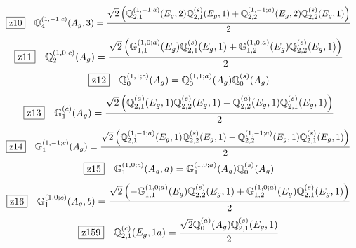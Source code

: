 \documentclass[fleqn,10pt,landscape]{jsarticle}
\begin{document}
\begin{dmath*}
\hspace*{3mm}\fbox{z10}\quad \mathbb{Q}_{4}^{(1,-1;c)}(A_{g},3)=\frac{\sqrt{2} \left(\mathbb{Q}_{2,1}^{(1,-1;a)}(E_{g},2) \mathbb{Q}_{2,1}^{(s)}(E_{g},1) + \mathbb{Q}_{2,2}^{(1,-1;a)}(E_{g},2) \mathbb{Q}_{2,2}^{(s)}(E_{g},1)\right)}{2}
\end{dmath*}
\begin{dmath*}
\hspace*{3mm}\fbox{z11}\quad \mathbb{Q}_{2}^{(1,0;c)}(A_{g})=\frac{\sqrt{2} \left(\mathbb{G}_{1,1}^{(1,0;a)}(E_{g}) \mathbb{Q}_{2,1}^{(s)}(E_{g},1) + \mathbb{G}_{1,2}^{(1,0;a)}(E_{g}) \mathbb{Q}_{2,2}^{(s)}(E_{g},1)\right)}{2}
\end{dmath*}
\begin{dmath*}
\hspace*{3mm}\fbox{z12}\quad \mathbb{Q}_{0}^{(1,1;c)}(A_{g})=\mathbb{Q}_{0}^{(1,1;a)}(A_{g}) \mathbb{Q}_{0}^{(s)}(A_{g})
\end{dmath*}
\begin{dmath*}
\hspace*{3mm}\fbox{z13}\quad \mathbb{G}_{1}^{(c)}(A_{g})=\frac{\sqrt{2} \left(\mathbb{Q}_{2,1}^{(a)}(E_{g},1) \mathbb{Q}_{2,2}^{(s)}(E_{g},1) - \mathbb{Q}_{2,2}^{(a)}(E_{g},1) \mathbb{Q}_{2,1}^{(s)}(E_{g},1)\right)}{2}
\end{dmath*}
\begin{dmath*}
\hspace*{3mm}\fbox{z14}\quad \mathbb{G}_{1}^{(1,-1;c)}(A_{g})=\frac{\sqrt{2} \left(\mathbb{Q}_{2,1}^{(1,-1;a)}(E_{g},1) \mathbb{Q}_{2,2}^{(s)}(E_{g},1) - \mathbb{Q}_{2,2}^{(1,-1;a)}(E_{g},1) \mathbb{Q}_{2,1}^{(s)}(E_{g},1)\right)}{2}
\end{dmath*}
\begin{dmath*}
\hspace*{3mm}\fbox{z15}\quad \mathbb{G}_{1}^{(1,0;c)}(A_{g},a)=\mathbb{G}_{1}^{(1,0;a)}(A_{g}) \mathbb{Q}_{0}^{(s)}(A_{g})
\end{dmath*}
\begin{dmath*}
\hspace*{3mm}\fbox{z16}\quad \mathbb{G}_{1}^{(1,0;c)}(A_{g},b)=\frac{\sqrt{2} \left(- \mathbb{G}_{1,1}^{(1,0;a)}(E_{g}) \mathbb{Q}_{2,2}^{(s)}(E_{g},1) + \mathbb{G}_{1,2}^{(1,0;a)}(E_{g}) \mathbb{Q}_{2,1}^{(s)}(E_{g},1)\right)}{2}
\end{dmath*}
\begin{dmath*}
\hspace*{3mm}\fbox{z159}\quad \mathbb{Q}_{2,1}^{(c)}(E_{g},1a)=\frac{\sqrt{2} \mathbb{Q}_{0}^{(a)}(A_{g}) \mathbb{Q}_{2,1}^{(s)}(E_{g},1)}{2}
\end{dmath*}
\end{document}
